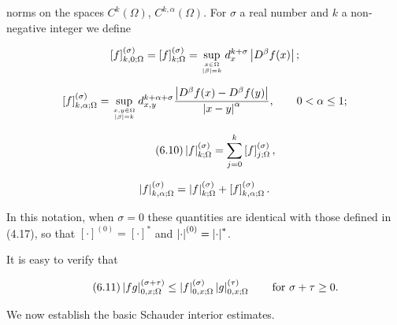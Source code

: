 



norms on the spaces $C^k(\Omega)$, $C^{k,\alpha}(\Omega)$. For $\sigma$ a real number and $k$ a non-negative integer we define

\begin{equation}
\left[f\right]_{k,0;\Omega}^{(\sigma)}=\left[f\right]_{k;\Omega}^{(\sigma)}=\sup_{x\in\Omega \atop |\beta|=k} d_x^{k+\sigma}\left|D^\beta f(x)\right|;
\end{equation}

\begin{equation}
\left[f\right]_{k,\alpha;\Omega}^{(\sigma)}=\sup_{x,y\in\Omega \atop |\beta|=k} d_{x,y}^{k+\alpha+\sigma}\frac{\left|D^\beta f(x)-D^\beta f(y)\right|}{\left|x-y\right|^\alpha},\qquad 0<\alpha\le 1;
\end{equation}

\begin{equation}
\tag{6.10}
\left|f\right|_{k;\Omega}^{(\sigma)}=\sum_{j=0}^k \left[f\right]_{j;\Omega}^{(\sigma)},
\end{equation}

\begin{equation}
\left|f\right|_{k,\alpha;\Omega}^{(\sigma)}=\left|f\right|_{k;\Omega}^{(\sigma)}+\left[f\right]_{k,\alpha;\Omega}^{(\sigma)}.
\end{equation}

In this notation, when $\sigma=0$ these quantities are identical with those defined in (4.17), so that $\left[\cdot\right]^{(0)}=\left[\cdot\right]^*$ and $\left|\cdot\right|^{(0)}=\left|\cdot\right|^*$.

It is easy to verify that

\begin{equation}
\tag{6.11}
\left|fg\right|_{0,x;\Omega}^{(\sigma+\tau)}\le \left|f\right|_{0,x;\Omega}^{(\sigma)}\left|g\right|_{0,x;\Omega}^{(\tau)} \qquad \text{for }\sigma+\tau\ge 0.
\end{equation}

We now establish the basic Schauder interior estimates.

